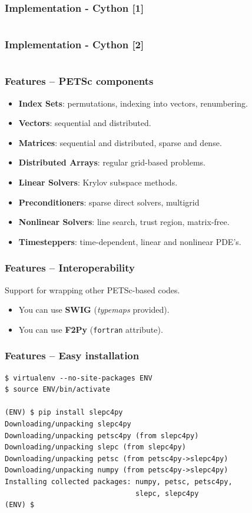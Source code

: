 \documentclass{beamer}
\begin{document}
\begin{frame}
  \frametitle{Implementation - Cython [1]}
  \small\inputminted[firstline=1]{cython}{cython.pxi}
\end{frame}
\begin{frame}
  \frametitle{Implementation - Cython [2]}
  \small\inputminted[firstline=3]{cython}{cython.pyx}
\end{frame}

\begin{frame}
  \frametitle{Features -- PETSc components}
  \begin{itemize}
  \item \textbf{Index Sets}: permutations, indexing into vectors, renumbering.
  \item \textbf{Vectors}: sequential and distributed.
  \item \textbf{Matrices}: sequential and distributed, sparse and dense.
  \item \textbf{Distributed Arrays}: regular grid-based problems.
  \item \textbf{Linear Solvers}: Krylov subspace methods.
  \item \textbf{Preconditioners}: sparse direct solvers, multigrid
  \item \textbf{Nonlinear Solvers}: line search, trust region, matrix-free.
  \item \textbf{Timesteppers}: time-dependent, linear and nonlinear PDE's.
  \end{itemize}
\end{frame}

\begin{frame}
  \frametitle{Features -- Interoperability}
  Support for wrapping other PETSc-based codes.
  \begin{itemize}
  \item You can use \textbf{SWIG} (\textsl{typemaps} provided).
  \item You can use \textbf{F2Py} (\texttt{fortran} attribute).
  \end{itemize}
\end{frame}

\begin{frame}[fragile]
  \frametitle{Features -- Easy installation}
\begin{verbatim}
$ virtualenv --no-site-packages ENV
$ source ENV/bin/activate

(ENV) $ pip install slepc4py
Downloading/unpacking slepc4py
Downloading/unpacking petsc4py (from slepc4py)
Downloading/unpacking slepc (from slepc4py)
Downloading/unpacking petsc (from petsc4py->slepc4py)
Downloading/unpacking numpy (from petsc4py->slepc4py)
Installing collected packages: numpy, petsc, petsc4py,
                               slepc, slepc4py
(ENV) $
\end{verbatim}
\end{frame}
\end{document}
